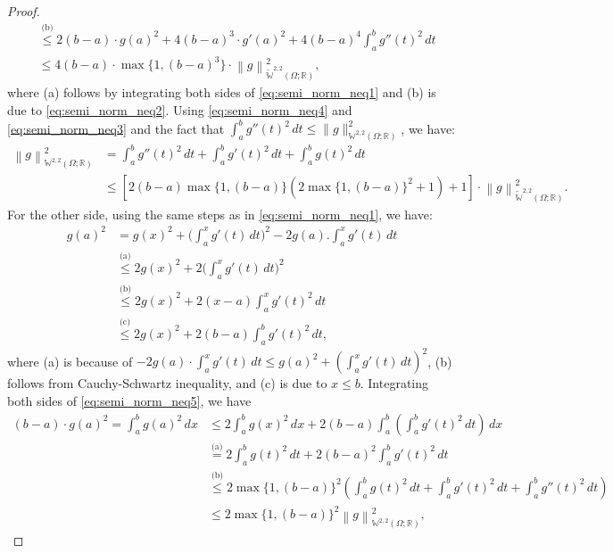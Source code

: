 \documentclass[10pt,a4paper]{amsart}
\newcommand{\lec}[2]{\stackrel{\text{#1}}{#2}}
\newcommand{\norm}[1]{\left\lVert#1\right\rVert}
\newcommand{\sob}[2]{\mathbb{W}^{#1,#2}\left(\Omega; \mathbb{R}\right)}
\newcommand{\sobeq}[2]{\widetilde{\mathbb{W}}^{#1,#2}\left(\Omega; \mathbb{R}\right)}
\begin{document}
\begin{proof}
\begin{align}
        &\lec{(b)}{\leqslant} 2(b-a)\cdot g(a)^2 + 4(b-a)^3\cdot g'(a)^2 + 4(b-a)^4 \int_a^b g''(t)^2\,dt \nonumber \\ 
        &\leqslant 4(b-a)\cdot\max\{1, (b-a)^3\}\cdot\norm{g}^2_{\sobeq{2}{2}},
    \end{align}
    where (a) follows by integrating both sides of \eqref{eq:semi_norm_neq1} and (b) is due to \eqref{eq:semi_norm_neq2}. Using \eqref{eq:semi_norm_neq4} and \eqref{eq:semi_norm_neq3} and the fact that $\int_a^b g''(t)^2\, dt \leqslant \|g\|^2_{\sob{2}{2}}$, we have:
    \begin{align}
        \norm{g}^2_{\sob{2}{2}} &= \int_a^b g''(t)^2\, dt +  \int_a^b g'(t)^2\, dt + \int_a^b g(t)^2\, dt \nonumber \\  &\leqslant \left[2(b-a)\max\{1, (b-a)\} \left (2\max\{1, (b-a)\}^2 + 1 \right) +1\right] \cdot\norm{g}^2_{\sobeq{2}{2}}.
    \end{align}
    For the other side, using the same steps as in \eqref{eq:semi_norm_neq1}, we have:
    \begin{align}\label{eq:semi_norm_neq5}
        g(a)^2 &= g(x)^2 + \biggl(\int_a^x g'(t)\,dt \biggr)^2 - 2g(a).\int_a^x g'(t)\,dt \nonumber \\ 
        &\lec{(a)}{\leqslant} 2g(x)^2 + 2\biggl(\int_a^x g'(t)\,dt \biggr)^2 \nonumber \\
        &\lec{(b)}{\leqslant} 2g(x)^2 + 2(x-a)\int_a^x g'(t)^2\,dt \nonumber \\  
        &\lec{(c)}{\leqslant}  2g(x)^2 + 2(b-a)\int_a^b g'(t)^2\,dt,
    \end{align}
    where (a) is because of $-2g(a)\cdot\int_a^x g'(t)\,dt \leqslant g(a)^2 + \left(\int_a^x g'(t)\,dt \right)^2$, (b) follows from Cauchy-Schwartz inequality, and (c) is due to $x \leqslant b$. Integrating both sides of \eqref{eq:semi_norm_neq5}, we have
    \begin{align}\label{eq:semi_norm_neq6}
         (b-a)\cdot g(a)^2 = \int_a^b g(a)^2\,dx  &\leqslant 2\int_a^b g(x)^2\,dx + 2(b-a)\int_a^b \left(\int_a^b g'(t)^2\,dt \right)\,dx \nonumber \\ 
        &\lec{(a)}{=} 2\int_a^b g(t)^2\,dt + 2(b-a)^2 \int_a^b g'(t)^2\,dt \nonumber \\
        &\lec{(b)}{\leqslant} 2\max\{1, (b-a)\}^2\left(\int_a^b g(t)^2\,dt + \int_a^b g'(t)^2\,dt + \int_a^b g''(t)^2\,dt\right) \nonumber \\
        &\leqslant 2\max\{1, (b-a)\}^2 \norm{g}^2_{\sob{2}{2}},
    \end{align}

\end{proof}
\end{document}
